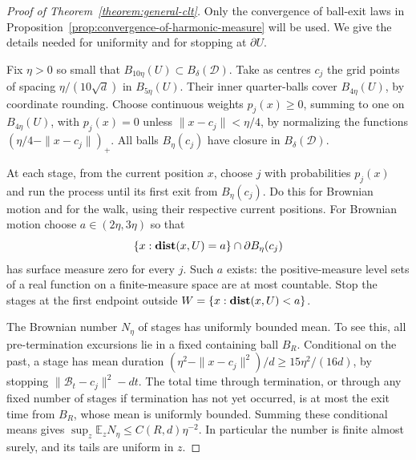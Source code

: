 \documentclass[12pt]{amsart}
\numberwithin{equation}{section}
\DeclareMathOperator{\dist}{\mathop{\bf dist{}}}
\begin{document}
\begin{proof}[Proof of Theorem~\ref{theorem:general-clt}]
Only the convergence of ball-exit laws in Proposition~\ref{prop:convergence-of-harmonic-measure} will be used. We give the details needed for uniformity and for stopping at $\partial U$.

Fix $\eta>0$ so small that $B_{10\eta}(U)\subset B_\delta(\mathcal D)$. Take as centres $c_j$ the grid points of spacing $\eta/(10\sqrt d)$ in $B_{5\eta}(U)$. Their inner quarter-balls cover $B_{4\eta}(U)$, by coordinate rounding. Choose continuous weights $p_j(x)\geq0$, summing to one on $B_{4\eta}(U)$, with $p_j(x)=0$ unless $\|x-c_j\|<\eta/4$, by normalizing the functions $(\eta/4-\|x-c_j\|)_+$. All balls $B_\eta(c_j)$ have closure in $B_\delta(\mathcal D)$.

At each stage, from the current position $x$, choose $j$ with probabilities $p_j(x)$ and run the process until its first exit from $B_\eta(c_j)$. Do this for Brownian motion and for the walk, using their respective current positions. For Brownian motion choose $a\in(2\eta,3\eta)$ so that
\[
 \{x:\dist(x,U)=a\}\cap\partial B_\eta(c_j)
\]
has surface measure zero for every $j$. Such $a$ exists: the positive-measure level sets of a real function on a finite-measure space are at most countable. Stop the stages at the first endpoint outside $W=\{x:\dist(x,U)<a\}$.

The Brownian number $N_\eta$ of stages has uniformly bounded mean. To see this, all pre-termination excursions lie in a fixed containing ball $B_R$. Conditional on the past, a stage has mean duration
$(\eta^2-\|x-c_j\|^2)/d\geq15\eta^2/(16d)$, by stopping $\|\mathcal B_t-c_j\|^2-dt$. The total time through termination, or through any fixed number of stages if termination has not yet occurred, is at most the exit time from $B_R$, whose mean is uniformly bounded. Summing these conditional means gives $\sup_z\mathbb E_zN_\eta\leq C(R,d)\eta^{-2}$. In particular the number is finite almost surely, and its tails are uniform in $z$.


\end{proof}
\end{document}
